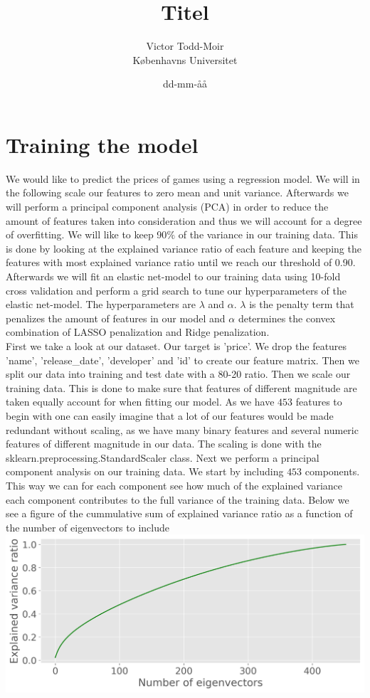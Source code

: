 \documentclass[12pt,a4paper]{article}
\author{Victor Todd-Moir\\Københavns Universitet}
\date{dd-mm-åå}
\title{Titel}
\begin{document}
\section*{Training the model}
We would like to predict the prices of games using a regression model. We will in the following scale our features to zero mean and unit variance. Afterwards we will perform a principal component analysis (PCA) in order to reduce the amount of features taken into consideration and thus we will account for a degree of overfitting. We will like to keep 90$\text{\%}$ of the variance in our training data. This is done by looking at the explained variance ratio of each feature and keeping the features with most explained variance ratio until we reach our threshold of 0.90. Afterwards we will fit an elastic net-model to our training data using 10-fold cross validation and perform a grid search to tune our hyperparameters of the elastic net-model. The hyperparameters are $\lambda$ and $\alpha$. $\lambda$ is the penalty term that penalizes the amount of features in our model and $\alpha$ determines the convex combination of LASSO penalization and Ridge penalization.\\
First we take a look at our dataset. Our target is 'price'. We drop the features 'name', 'release\_date', 'developer' and 'id' to create our feature matrix. Then we split our data into training and test date with a 80-20 ratio. Then we scale our training data. This is done to make sure that features of different magnitude are taken equally account for when fitting our model. As we have $453$ features to begin with one can easily imagine that a lot of our features would be made redundant without scaling, as we have many binary features and several numeric features of different magnitude in our data. The scaling is done with the sklearn.preprocessing.StandardScaler class. Next we perform a principal component analysis on our training data. We start by including $453$ components. This way we can for each component see how much of the explained variance each component contributes to the full variance of the training data. Below we see a figure of the cummulative sum of explained variance ratio as a function of the number of eigenvectors to include\\
\includegraphics[scale = 0.5]{cumsumEigen.png}
\end{document}
